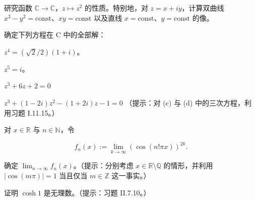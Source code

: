 \begin{exercises}
\item

研究函数 $ \mathbb{C} \to \mathbb{C} $，$ z \mapsto z^2 $ 的性质。特别地，对 $ z = x + iy $，计算双曲线 $ x^2 - y^2 = \text{const} $、$ xy = \text{const} $ 以及直线 $ x = \text{const} $、$ y = \text{const} $ 的像。

\item

确定下列方程在 C 中的全部解：

\begin{items}
\item

$ z^{4} = (\sqrt{2}/2)(1 + i) $。

\item

$ z^{5}=i $。

\item

$ z^{3} + 6z + 2 = 0 $

\item

$ z^{3}+(1-2i)z^{2}-(1+2i)z-1=0 $
（提示：对 (c) 与 (d) 中的三次方程，利用习题 I.11.15。）

\end{items}

\item

对 $ x \in \mathbb{R} $ 与 $ n \in \mathbb{N} $，令

\[
f_{n}(x):=\lim_{k\to\infty}\left(\cos(n!\pi x)\right)^{2k}.
\]

确定 $ \lim_{n \to \infty} f_n(x) $。（提示：分别考虑 $ x \in \mathbb{R} \setminus \mathbb{Q} $ 的情形，并利用 $ |\cos(m\pi)| = 1 $ 当且仅当 $ m \in \mathbb{Z} $ 这一事实。）

\item

证明 $ \cosh 1 $ 是无理数。（提示：习题 II.7.10。）

\end{exercises}
